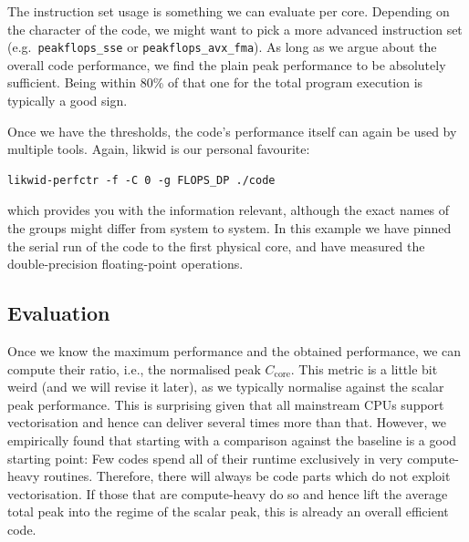 \begin{instructions}{\likwid}
The instruction set usage is something we can evaluate per core.
Depending on the character of the code, we might want to pick a more advanced instruction set (e.g.~\texttt{peakflops\_sse} or \texttt{peakflops\_avx\_fma}).
As long as we argue about the overall code performance, we find the plain peak performance to be absolutely sufficient. 
Being within 80\% of that one for the total program execution is typically a good sign.


Once we have the thresholds, the code's performance itself can again be used by multiple tools.
Again, likwid is our personal favourite:

\begin{verbatim}
likwid-perfctr -f -C 0 -g FLOPS_DP ./code
\end{verbatim}

\noindent
which provides you with the information relevant, although the exact names of the groups might differ from system to system. In this example we have pinned the serial run of the code to the first physical core, and have measured the double-precision floating-point operations.
\end{instructions}






 
\subsection{Evaluation}

Once we know the maximum performance and the obtained performance, we can compute
their ratio, i.e., the normalised peak $C_{\text{core}}$.
This metric is a little bit weird (and we will revise it later), as we typically
normalise against the scalar peak performance.
This is surprising given that all mainstream CPUs support vectorisation and hence
can deliver several times more than that.
However, we empirically found that starting with a comparison against the
baseline is a good starting point:
Few codes spend all of their runtime exclusively in very compute-heavy routines.
Therefore, there will always be code parts which do not exploit vectorisation.
If those that are compute-heavy do so and hence lift the average total peak into
the regime of the scalar peak, this is already an overall efficient code.


